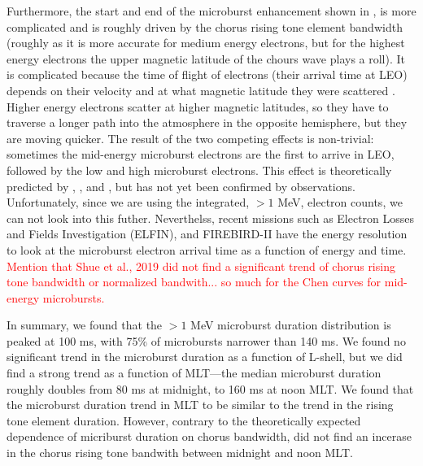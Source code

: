 \documentclass[draft]{agujournal2019}
\begin{document}
Furthermore, the start and end of the microburst enhancement shown in , is more complicated and is roughly driven by the chorus rising tone element bandwidth (roughly as it is more accurate for medium energy electrons, but for the highest energy electrons the upper magnetic latitude of the chours wave plays a roll). It is complicated because the time of flight of electrons (their arrival time at LEO) depends on their velocity and at what magnetic latitude they were scattered \cite{Saito2012}. Higher energy electrons scatter at higher magnetic latitudes, so they have to traverse a longer path into the atmosphere in the opposite hemisphere, but they are moving quicker. The result of the two competing effects is non-trivial: sometimes the mid-energy microburst electrons are the first to arrive in LEO, followed by the low and high microburst electrons. This effect is theoretically predicted by , , and , but has not yet been confirmed by observations. Unfortunately, since we are using the integrated, $>1$ MeV, electron counts, we can not look into this futher. Neverthelss, recent missions such as Electron Losses and Fields Investigation (ELFIN), and FIREBIRD-II have the energy resolution to look at the microburst electron arrival time as a function of energy and time. \textcolor{red}{Mention that Shue et al., 2019 did not find a significant trend of chorus rising tone bandwidth or normalized bandwith... so much for the Chen curves for mid-energy microbursts.}

In summary, we found that the $>1$ MeV microburst duration distribution is peaked at 100 ms, with 75\% of microbursts narrower than 140 ms. We found no significant trend in the microburst duration as a function of L-shell, but we did find a strong trend as a function of MLT---the median microburst duration roughly doubles from 80 ms at midnight, to 160 ms at noon MLT. We found that the microburst duration trend in MLT to be similar to the trend in the rising tone element duration. However, contrary to the theoretically expected dependence of micriburst duration on chorus bandwidth,  did not find an incerase in the chorus rising tone bandwith between midnight and noon MLT.

%
%
%
%
\end{document}
